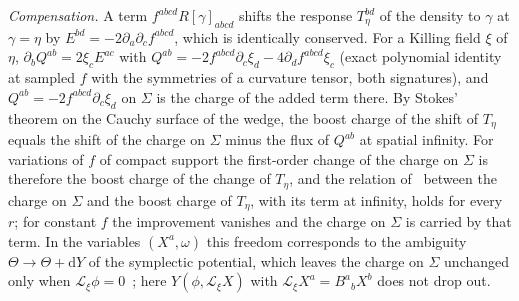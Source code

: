\emph{Compensation.} A term \(f^{abcd}R[\gamma]_{abcd}\) shifts the response \(T_\eta^{bd}\) of the density to \(\gamma\) at \(\gamma=\eta\) by \(E^{bd}=-2\partial_a\partial_cf^{abcd}\), which is identically conserved. For a Killing field \(\xi\) of \(\eta\), \(\partial_bQ^{ab}=2\xi_cE^{ac}\) with \(Q^{ab}=-2f^{abcd}\partial_c\xi_d-4\partial_df^{abcd}\xi_c\) (exact polynomial identity at sampled \(f\) with the symmetries of a curvature tensor, both signatures), and \(Q^{ab}=-2f^{abcd}\partial_c\xi_d\) on \(\Sigma\) is the charge of the added term there. By Stokes' theorem on the Cauchy surface of the wedge, the boost charge of the shift of \(T_\eta\) equals the shift of the charge on \(\Sigma\) minus the flux of \(Q^{ab}\) at spatial infinity. For variations of \(f\) of compact support the first-order change of the charge on \(\Sigma\) is therefore the boost charge of the change of \(T_\eta\), and the relation of~\cite{IyerWald1994} between the charge on \(\Sigma\) and the boost charge of \(T_\eta\), with its term at infinity, holds for every \(r\); for constant \(f\) the improvement vanishes and the charge on \(\Sigma\) is carried by that term. In the variables \((X^a,\omega)\) this freedom corresponds to the ambiguity \(\Theta\to\Theta+\mathrm dY\) of the symplectic potential, which leaves the charge on \(\Sigma\) unchanged only when \(\mathcal L_\xi\phi=0\)~\cite{JacobsonKangMyers1994}; here \(Y(\phi,\mathcal L_\xi X)\) with \(\mathcal L_\xi X^a=B^a{}_bX^b\) does not drop out.

